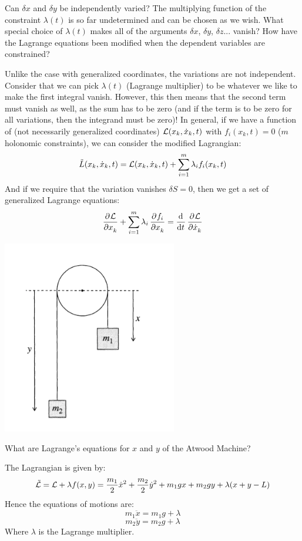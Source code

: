 \begin{p}
Can $\delta x$ and $\delta y$ be independently varied? The multiplying function of the constraint $\lambda(t)$ is so far undetermined and can be chosen as we wish. What special choice of $\lambda(t)$ makes all of the arguments $\delta x$, $\delta y$, $\delta z$... vanish? How have the Lagrange equations been modified when the dependent variables are constrained?
\end{p}
\begin{s}
Unlike the case with generalized coordinates, the variations are not independent. Consider that we can pick $\lambda (t)$ (Lagrange multiplier) to be whatever we like to make the first integral vanish. However, this then means that the second term must vanish as well, as the sum has to be zero (and if the term is to be zero for all variations, then the integrand must be zero)! In general, if we have a function of (not necessarily generalized coordinates) $\mathcal{L}(x_k, \dot{x}_k, t)$ with $f_{i}(x_k, t) = 0$ ($m$ holonomic constraints), we can consider the modified Lagrangian:
\[\tilde{L}(x_k, \dot{x}_k, t) = \mathcal{L}(x_k, \dot{x}_k, t) + \sum_{i=1}^m \lambda_i f_i(x_k, t)\]
And if we require that the variation vanishes $\delta S = 0$, then we get a set of generalized Lagrange equations:
\[\dpd{\LL}{x_k} + \sum_{i=1}^m \lambda_i \dpd{f_i}{x_k} = \dod{}{t}\dpd{\LL}{\dot{x}_k}\]

\end{s}

\begin{center}
    \includegraphics[scale=0.75]{Lecture-8/w8-img1.png}
\end{center}
\begin{p}
What are Lagrange's equations for $x$ and $y$ of the Atwood Machine?
\end{p}
\begin{s}
The Lagrangian is given by:
\[\tilde{\mathcal{L}} = \mathcal{L} + \lambda f(x,y) = \frac{m_1}{2}\dot{x}^2 + \frac{m_2}{2}\dot{y}^2 + m_1gx + m_2gy + \lambda(x+y-L)\]
Hence the equations of motions are:
\[m_1\ddot{x} = m_1g + \lambda\]
\[m_2\ddot{y} = m_2g + \lambda\]
Where $\lambda$ is the Lagrange multiplier.
\end{s}

